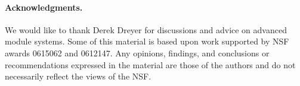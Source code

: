 \documentclass{sigplanconf}
\begin{document}




%

% 



\paragraph*{Acknowledgments.}
We would like to thank Derek Dreyer for discussions and advice on
advanced module systems.  Some of this material is based upon work 
supported by NSF awards 0615062 and 0612147.  
Any opinions, findings, and conclusions 
or recommendations expressed in the material are those of the authors 
and do not necessarily reflect the views of the NSF.



%

%
\end{document}
